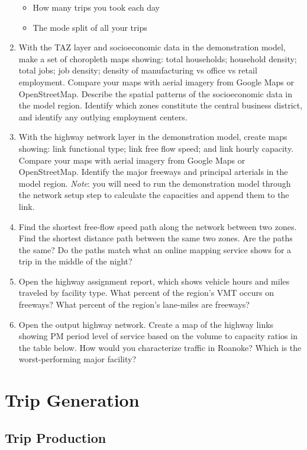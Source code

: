 \documentclass[
]{book}
\providecommand{\tightlist}{%
  \setlength{\itemsep}{0pt}\setlength{\parskip}{0pt}}
\begin{document}
\begin{enumerate}
  \begin{itemize}
  \tightlist
  \item
    How many trips you took each day
  \item
    The mode split of all your trips
  \end{itemize}
\item
  With the TAZ layer and socioeconomic data in the demonstration model, make a
  set of choropleth maps showing: total households; household density; total jobs;
  job density; density of manufacturing vs office vs retail employment. Compare
  your maps with aerial imagery from Google Maps or OpenStreetMap. Describe the
  spatial patterns of the socioeconomic data in the model region. Identify which
  zones constitute the central business district, and identify any outlying
  employment centers.
\item
  With the highway network layer in the demonstration model, create maps
  showing: link functional type; link free flow speed; and link hourly capacity.
  Compare your maps with aerial imagery from Google Maps or OpenStreetMap.
  Identify the major freeways and principal arterials in the model region. \emph{Note}:
  you will need to run the demonstration model through the network setup step to
  calculate the capacities and append them to the link.
\item
  Find the shortest free-flow speed path along the network between two zones.
  Find the shortest distance path between the same two zones. Are the paths the
  same? Do the paths match what an online mapping service shows for a trip in the
  middle of the night?
\item
  Open the highway assignment report, which shows vehicle hours and miles
  traveled by facility type. What percent of the region's VMT occurs on freeways?
  What percent of the region's lane-miles are freeways?
\item
  Open the output highway network. Create a map of the
  highway links showing PM period level of service based on the volume to capacity
  ratios in the table below. How would you characterize traffic in Roanoke? Which
  is the worst-performing major facility?
\end{enumerate}

\hypertarget{chap-tripgen}{%
\chapter{Trip Generation}\label{chap-tripgen}}

\hypertarget{trip-production}{%
\section{Trip Production}\label{trip-production}}
\end{document}
